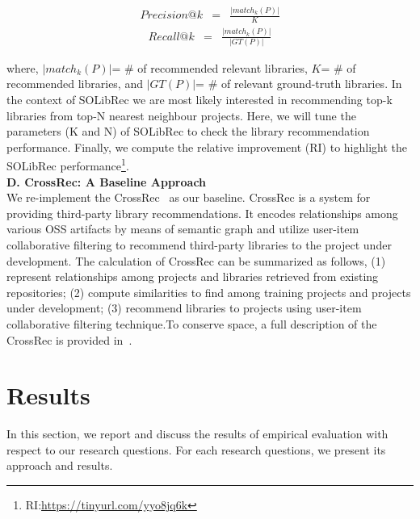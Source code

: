 \documentclass[paper]{ieice}
\begin{document}
\begin{eqnarray}
    Precision@ k & = & \frac{|match_{k}(P)|}{K}
\end{eqnarray}
\begin{eqnarray}
    Recall@k & = & \frac{|match_{k}(P)|}{|GT(P)|}
\end{eqnarray}

where, $|match_{k}(P)|$= \# of recommended relevant libraries, $K$= \# of recommended libraries, and $|GT(P)|$= \# of relevant ground-truth libraries.
In the context of SOLibRec we are most likely interested in recommending top-k libraries from top-N nearest neighbour projects. Here, we will tune the parameters (K and N) of SOLibRec to check the library recommendation performance. Finally, we compute the relative improvement (RI) to highlight the SOLibRec performance\footnote{RI:\url{https://tinyurl.com/yyo8jq6k}}. \\


\noindent\textbf{D. CrossRec: A Baseline Approach}\\

We re-implement the CrossRec~\cite{nguyen2020crossrec} as our baseline. CrossRec is a system for providing third-party library recommendations. It encodes relationships among various OSS artifacts by means of semantic graph and utilize user-item collaborative filtering to recommend third-party libraries to the project under development. The calculation of CrossRec can be summarized as follows, (1) represent relationships among projects and libraries retrieved from existing repositories; (2) compute similarities to find among training projects and projects under development; (3) recommend libraries to projects using user-item collaborative filtering technique.To conserve space, a full description of the CrossRec is provided in~\cite{nguyen2020crossrec}.


\section{Results} 
\label{sec:results}
In this section, we report and discuss the results of empirical evaluation with respect to our research questions. For each research questions, we present its approach and results.\\
\end{document}

